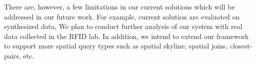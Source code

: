 \documentclass[12pt]{report}
\begin{document}
There are, however, a few limitations in our current solutions which
will be addressed in our future work.  For example, current solution
are evaluated on synthesized data, We plan to conduct further
analysis of our system with real data collected in the RFID lab.  In
addition, we intend to extend our framework to support more spatial
query types such as spatial skyline, spatial joins, closest-pairs,
etc.




\end{document}
